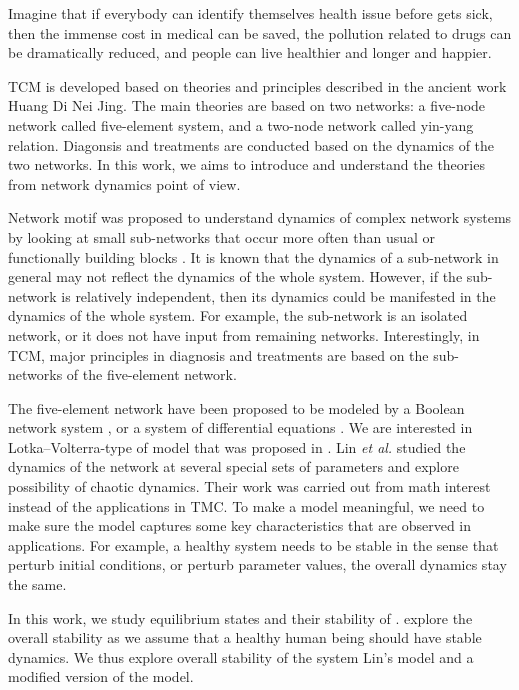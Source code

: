 \documentclass{article}
\newcommand{\etal}{{\it et al.}}
\begin{document}
Imagine that if everybody can identify themselves health issue before gets sick, then the immense cost in medical can be saved,  the pollution related to drugs can be dramatically reduced, and  people can live healthier and longer and happier.

TCM is developed based on theories and principles described in the ancient work Huang Di Nei Jing. The main theories are based on two networks: a five-node network called five-element system, and a two-node network called yin-yang relation.  Diagonsis and treatments are conducted based on the dynamics of the two networks.  In this work, we aims to introduce and understand the theories from network dynamics point of view. 

Network motif was proposed to understand dynamics of complex network systems by looking at small sub-networks that occur more often than usual or functionally building blocks \cite{milo2002, Alon2007}. It is  known that the dynamics of a sub-network  in general may not reflect the dynamics of the whole system. However, if the  sub-network is relatively independent, then its dynamics could be manifested in the dynamics of the whole system.  For example, the sub-network is an isolated network, or it does not have input from remaining networks. 
Interestingly, in TCM, major principles in diagnosis and treatments are based on the sub-networks  of the five-element network. 

The five-element network have been proposed to be modeled by a Boolean network system \cite{Bellavite1998}, or a system of differential equations \cite{Nian2025,Lin2020,zhang2011,Yang2025}.
We are interested in  Lotka–Volterra-type of model that was proposed in \cite{Lin2020}. Lin \etal \cite{Lin2020} studied the dynamics of the network at several special sets of parameters and explore possibility of chaotic dynamics. Their work was carried out from math interest instead of the applications in TMC.  To make a model meaningful, we need to make sure the model captures some key  characteristics  that are observed in applications. For example, a healthy system needs to be stable in the sense that perturb initial conditions, or perturb parameter values, the overall dynamics stay the same. 

In this work, we study equilibrium states and their stability of . 
explore the overall stability as we assume that a healthy human being should have stable dynamics. We thus explore overall stability of the system Lin's model and a modified version of the model. 
\end{document}
